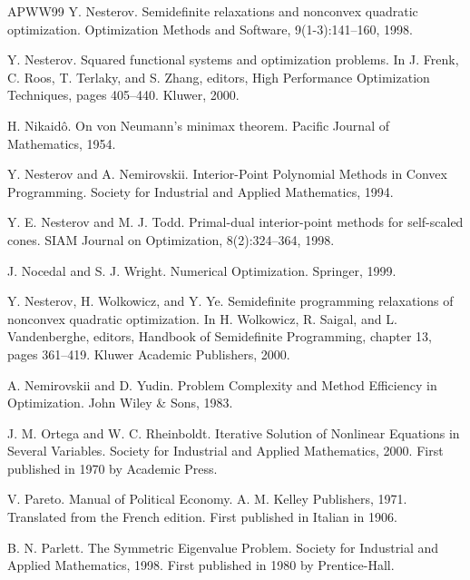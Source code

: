 \begin{thebibliography}{APWW99}
 Y. Nesterov. Semidefinite relaxations and nonconvex quadratic optimization. Optimization Methods and Software, 9(1-3):141–160, 1998.

 Y. Nesterov. Squared functional systems and optimization problems. In J. Frenk, C. Roos, T. Terlaky, and S. Zhang, editors, High Performance Optimization Techniques, pages 405–440. Kluwer, 2000.

 H. Nikaidô. On von Neumann’s minimax theorem. Pacific Journal of Mathematics, 1954.

 Y. Nesterov and A. Nemirovskii. Interior-Point Polynomial Methods in Convex Programming. Society for Industrial and Applied Mathematics, 1994.

 Y. E. Nesterov and M. J. Todd. Primal-dual interior-point methods for self-scaled cones. SIAM Journal on Optimization, 8(2):324–364, 1998.

 J. Nocedal and S. J. Wright. Numerical Optimization. Springer, 1999.

 Y. Nesterov, H. Wolkowicz, and Y. Ye. Semidefinite programming relaxations of nonconvex quadratic optimization. In H. Wolkowicz, R. Saigal, and L. Vandenberghe, editors, Handbook of Semidefinite Programming, chapter 13, pages 361–419. Kluwer Academic Publishers, 2000.

 A. Nemirovskii and D. Yudin. Problem Complexity and Method Efficiency in Optimization. John Wiley \& Sons, 1983.

 J. M. Ortega and W. C. Rheinboldt. Iterative Solution of Nonlinear Equations in Several Variables. Society for Industrial and Applied Mathematics, 2000. First published in 1970 by Academic Press.

 V. Pareto. Manual of Political Economy. A. M. Kelley Publishers, 1971. Translated from the French edition. First published in Italian in 1906.

 B. N. Parlett. The Symmetric Eigenvalue Problem. Society for Industrial and Applied Mathematics, 1998. First published in 1980 by Prentice-Hall.


\end{thebibliography}
